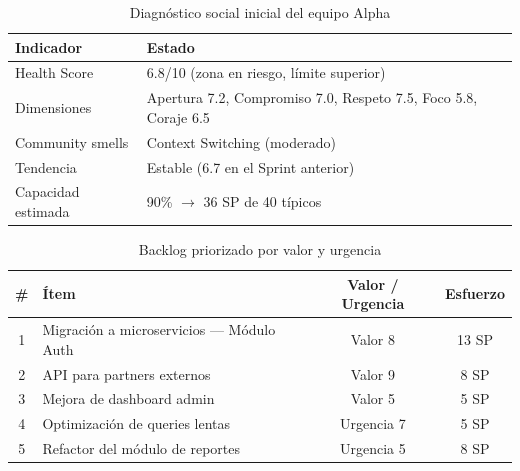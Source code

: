 \begin{table}[h]
    \centering
    \small
    \begin{tabularx}{\textwidth}{|l|X|}
        \hline
        \textbf{Indicador} & \textbf{Estado}                                                 \\
        \hline
        Health Score       & 6.8/10 (zona en riesgo, límite superior)                        \\
        Dimensiones        & Apertura 7.2, Compromiso 7.0, Respeto 7.5, Foco 5.8, Coraje 6.5 \\
        Community smells   & Context Switching (moderado)                                    \\
        Tendencia          & Estable (6.7 en el Sprint anterior)                             \\
        Capacidad estimada & 90\% $\rightarrow$ 36 SP de 40 típicos                          \\
        \hline
    \end{tabularx}
    \caption{Diagnóstico social inicial del equipo Alpha}
    \label{tab:diagnostico-alpha}
\end{table}
\FloatBarrier

\begin{table}[h]
    \centering
    \small
    \begin{tabularx}{\textwidth}{|c|X|c|c|}
        \hline
        \textbf{\#} & \textbf{Ítem}                            & \textbf{Valor / Urgencia} & \textbf{Esfuerzo} \\
        \hline
        1           & Migración a microservicios — Módulo Auth & Valor 8                   & 13 SP             \\
        2           & API para partners externos               & Valor 9                   & 8 SP              \\
        3           & Mejora de dashboard admin                & Valor 5                   & 5 SP              \\
        4           & Optimización de queries lentas           & Urgencia 7                & 5 SP              \\
        5           & Refactor del módulo de reportes          & Urgencia 5                & 8 SP              \\
        \hline
    \end{tabularx}
    \caption{Backlog priorizado por valor y urgencia}
    \label{tab:backlog-alpha}
\end{table}
\FloatBarrier

